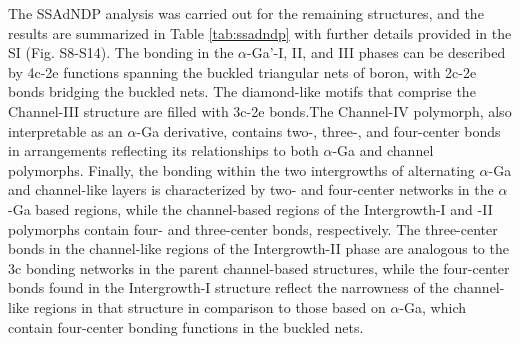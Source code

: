 \documentclass[reprint,aps,prl,twocolumn,letterpaper]{revtex4-2}
\begin{document}
The SSAdNDP analysis was carried out for the remaining structures, and the results are summarized in Table \ref{tab:ssadndp} with further details provided in the SI (Fig. S8-S14). The bonding in the $\alpha$-Ga'-I, II, and III phases can be described by 4c-2e functions spanning the buckled triangular nets of boron, with 2c-2e bonds bridging the buckled nets. The diamond-like motifs that comprise the Channel-III structure are filled with 3c-2e bonds.The Channel-IV polymorph, also interpretable as an $\alpha$-Ga derivative, contains two-, three-, and four-center bonds in arrangements reflecting its relationships to both $\alpha$-Ga and channel polymorphs. Finally, the bonding within the two intergrowths of alternating $\alpha$-Ga and channel-like layers is characterized by two- and four-center networks in the $\alpha$-Ga based regions, while the channel-based regions of the Intergrowth-I and -II polymorphs contain four- and three-center bonds, respectively. The three-center bonds in the channel-like regions of the Intergrowth-II phase are analogous to the 3c bonding networks in the parent channel-based structures, while the four-center bonds found in the Intergrowth-I structure reflect the narrowness of the channel-like regions in that structure  in comparison to those based on $\alpha$-Ga, which contain four-center bonding functions in the buckled nets.


\begin{table}
    \centering
    \def\arraystretch{1}
    \caption{Summary of SSAdNDP analyses of boron phases at 100~GPa.}
\end{table}
\end{document}

